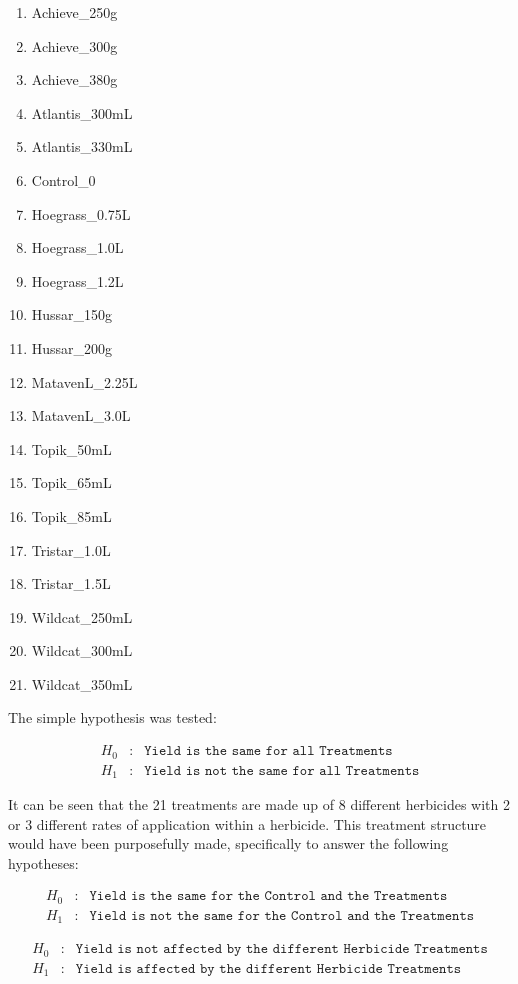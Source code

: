 \documentclass[a4paper, 10pt, fleqn, twosided]{memoir}
\begin{document}
\begin{enumerate}
\item  Achieve\_250g
\item  Achieve\_300g
\item  Achieve\_380g
\item  Atlantis\_300mL
\item  Atlantis\_330mL
\item  Control\_0
\item  Hoegrass\_0.75L
\item  Hoegrass\_1.0L
\item  Hoegrass\_1.2L
\item  Hussar\_150g
\item  Hussar\_200g
\item  MatavenL\_2.25L
\item  MatavenL\_3.0L
\item  Topik\_50mL
\item  Topik\_65mL
\item  Topik\_85mL
\item  Tristar\_1.0L
\item  Tristar\_1.5L
\item  Wildcat\_250mL
\item  Wildcat\_300mL
\item  Wildcat\_350mL
\end{enumerate}

The simple hypothesis was tested:

\begin{eqnarray*}
	H_0&:& \texttt{Yield is the same for all Treatments} \\
	H_1&:& \texttt{Yield is not the same for all Treatments}
\end{eqnarray*}

It can be seen that the 21 treatments are made up of 8 different herbicides with 2 or 3 different rates of application
within a herbicide. This treatment structure would have been purposefully made, specifically to answer the following
hypotheses:

\begin{eqnarray*}
	H_0&:& \texttt{Yield is the same for the Control and the Treatments} \\
	H_1&:& \texttt{Yield is not the same for the Control and the Treatments}
\end{eqnarray*}

\begin{eqnarray*}
	H_0&:& \texttt{Yield is not affected by the different Herbicide Treatments} \\
	H_1&:& \texttt{Yield is affected by the different Herbicide Treatments}
\end{eqnarray*}
\end{document}
